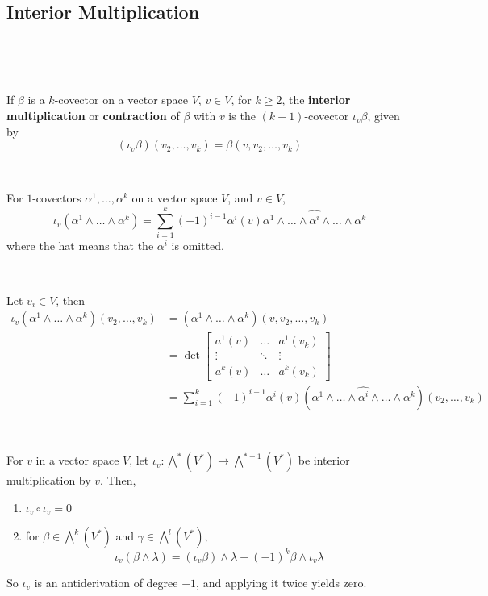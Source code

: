 \documentclass{article}
\begin{document}
\subsection{Interior Multiplication}
\

\begin{definition}
  \

  If $\beta$ is a $k$-covector on a vector space $V$, $v \in V$, for $k \geq 2$, the \textbf{interior multiplication} or \textbf{contraction} of $\beta$ with $v$ is the $(k-1)$-covector $\iota_v\beta$, given by $$(\iota_v\beta)(v_2, \dots, v_k) = \beta(v, v_2, \dots, v_k)$$
\end{definition}

\begin{proposition}
  \

  For $1$-covectors $\alpha^1, \dots, \alpha^k$ on a vector space $V$, and $v \in V$, $$\iota_v(\alpha^1 \wedge \dots \wedge \alpha^k) = \sum_{i=1}^k (-1)^{i-1} \alpha^i(v)\alpha^1\wedge \dots \wedge \hat{\alpha^i} \wedge \dots \wedge \alpha^k$$where the hat means that the $\alpha^i$ is omitted.
\end{proposition}

\begin{customproof}
  \

  Let $v_i \in V$, then
  \begin{align*}
    \iota_v(\alpha^1 \wedge \dots \wedge \alpha^k)(v_2, \dots, v_k) &= (\alpha^1 \wedge \dots \wedge \alpha^k)(v, v_2, \dots, v_k) \\
    &= \det
    \begin{bmatrix}
      a^1(v) &  \dots& a^1(v_k)\\
      \vdots & \ddots & \vdots\\
      a^k(v) & \dots & a^k(v_k)
    \end{bmatrix} \\
    &= \sum_{i=1}^k (-1)^{i-1} \alpha^i(v)(\alpha^1\wedge \dots \wedge \hat{\alpha^i} \wedge \dots \wedge \alpha^k)(v_2, \dots, v_k)
  \end{align*}
\end{customproof}

\begin{proposition}
  \

  For $v$ in a vector space $V$, let $\iota_v: \bigwedge^*(V^*) \to \bigwedge^{*-1} (V^*)$ be interior multiplication by $v$. Then,
  \begin{enumerate}
    \item $\iota_v \circ \iota_v = 0$
    \item for $\beta \in \bigwedge^k(V^*)$ and $\gamma \in \bigwedge^l(V^*)$, $$\iota_v(\beta \wedge \lambda) = (\iota_v \beta) \wedge \lambda + (-1)^k \beta \wedge \iota_v\lambda$$
  \end{enumerate}

  So $\iota_v$ is an antiderivation of degree $-1$, and applying it twice yields zero.
\end{proposition}
\end{document}
